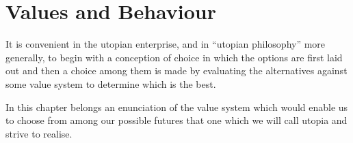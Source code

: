 \chapter{Values and Behaviour}\label{Values}

It is convenient in the utopian enterprise, and in ``utopian philosophy'' more generally, to begin with a conception of choice in which the options are first laid out and then a choice among them is made by evaluating the alternatives against some value system to determine which is the best.

In this chapter belongs an enunciation of the value system which would enable us to choose from among our possible futures that one which we will call utopia and strive to realise.


